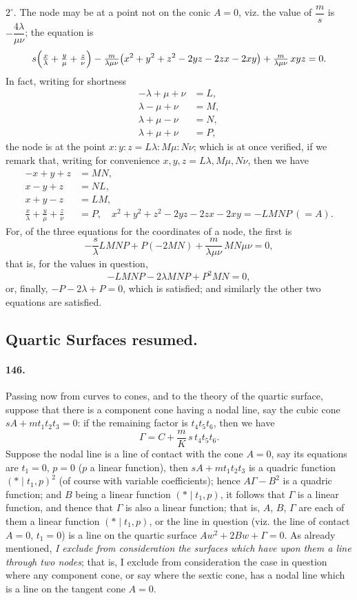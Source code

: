 \documentclass[11pt,a4paper]{article}
\begin{document}
$2^\circ$. The node may be at a point not on the conic $A = 0$, viz. the
value of $\dfrac{m}{s}$ is $-\dfrac{4\lambda}{\mu \nu}$; the equation is
\[
s\Bigl(\tfrac{x}{\lambda} + \tfrac{y}{\mu} + \tfrac{z}{\nu}\Bigr)
- \tfrac{m}{\lambda \mu \nu}\bigl(x^2 + y^2 + z^2 - 2yz - 2zx - 2xy\bigr)
+ \tfrac{m}{\lambda \mu \nu}\, xyz = 0.
\]
In fact, writing for shortness
\[
\begin{aligned}
- \lambda + \mu + \nu &= L, \\
\lambda - \mu + \nu &= M, \\
\lambda + \mu - \nu &= N, \\
\lambda + \mu + \nu &= P,
\end{aligned}
\]
the node is at the point $x : y : z = L\lambda : M\mu : N\nu$; which is
at once verified, if we remark that, writing for convenience
$x, y, z = L\lambda, M\mu, N\nu$, then we have
\[
\begin{aligned}
- x + y + z &= MN, \\
x - y + z &= NL, \\
x + y - z &= LM, \\
\tfrac{x}{\lambda} + \tfrac{y}{\mu} + \tfrac{z}{\nu} &= P,\quad
x^2 + y^2 + z^2 - 2yz - 2zx - 2xy = - LMNP\ (= A).
\end{aligned}
\]
For, of the three equations for the coordinates of a node, the first is
\[
- \frac{s}{\lambda} LMNP + P(-2MN) + \frac{m}{\lambda \mu \nu}\, MN\mu\nu = 0,
\]
that is, for the values in question,
\[
- LMNP - 2\lambda MNP + P^2 MN = 0,
\]
or, finally, $-P - 2\lambda + P = 0$, which is satisfied; and similarly
the other two equations are satisfied.

\subsection*{Quartic Surfaces resumed.}

\paragraph{146.}
Passing now from curves to cones, and to the theory of the quartic
surface, suppose that there is a component cone having a nodal line, say
the cubic cone $sA + m t_1 t_2 t_3 = 0$: if the remaining factor is
$t_4 t_5 t_6$, then we have
\[
\Gamma = C + \frac{m}{K}\, s\, t_4 t_5 t_6.
\]
Suppose the nodal line is a line of contact with the cone $A = 0$, say
its equations are $t_1 = 0$, $p = 0$ ($p$ a linear function), then
$sA + m t_1 t_2 t_3$ is a quadric function $(*\!\mid\! t_1, p)^2$ (of
course with variable coefficients); hence $A\Gamma - B^2$ is a quadric
function; and $B$ being a linear function $(*\!\mid\! t_1, p)$, it
follows that $\Gamma$ is a linear function, and thence that $\Gamma$ is
also a linear function; that is, $A$, $B$, $\Gamma$ are each of them a
linear function $(*\!\mid\! t_1, p)$, or the line in question (viz. the
line of contact $A = 0$, $t_1 = 0$) is a line on the quartic surface
$Aw^2 + 2Bw + \Gamma = 0$. As already mentioned, \textit{I exclude from
consideration the surfaces which have upon them a line through two
nodes}; that is, I exclude from consideration the case in question where
any component cone, or say where the sextic cone, has a nodal line which
is a line on the tangent cone $A = 0$.
\end{document}
